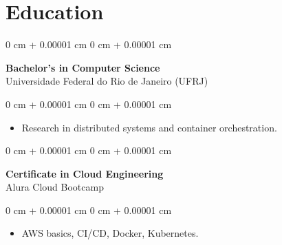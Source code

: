 \documentclass[10pt, letterpaper]{article}
\newenvironment{highlights}{
    \begin{itemize}[
        topsep=0.10 cm,
        parsep=0.10 cm,
        partopsep=0pt,
        itemsep=0pt,
        leftmargin=0 cm + 10pt
    ]
}{
    \end{itemize}
}
\newenvironment{onecolentry}{
    \begin{adjustwidth}{
        0 cm + 0.00001 cm
    }{
        0 cm + 0.00001 cm
    }
}{
    \end{adjustwidth}
}
\begin{document}
\section{Education}

\begin{onecolentry}
    \setcolumnwidth{\fill, 4.5cm}
    \begin{paracol}{2}
        \textbf{Bachelor's in Computer Science} \\ Universidade Federal do Rio de Janeiro (UFRJ)
        \switchcolumn
    \end{paracol}
\end{onecolentry}
\vspace{0.10cm}
\begin{onecolentry}
    \begin{highlights}
                \item Research in distributed systems and container orchestration.
    \end{highlights}
\end{onecolentry}

\vspace{0.2cm}

\begin{onecolentry}
    \setcolumnwidth{\fill, 4.5cm}
    \begin{paracol}{2}
        \textbf{Certificate in Cloud Engineering} \\ Alura Cloud Bootcamp
        \switchcolumn
    \end{paracol}
\end{onecolentry}
\vspace{0.10cm}
\begin{onecolentry}
    \begin{highlights}
                \item AWS basics, CI/CD, Docker, Kubernetes.
    \end{highlights}
\end{onecolentry}
\end{document}
